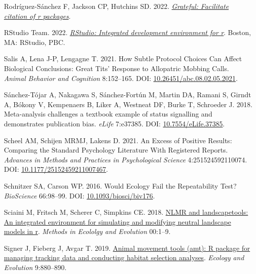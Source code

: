 \documentclass[10pt,a4paper]{article}
\newlength{\cslhangindent}
\newlength{\cslentryspacingunit} %
\newenvironment{CSLReferences}[2] %
 {%
  \setlength{\parindent}{0pt}
  \ifodd #1
  \let\oldpar\par
  \def\par{\hangindent=\cslhangindent\oldpar}
  \fi
  \setlength{\parskip}{#2\cslentryspacingunit}
 }%
 {}
\begin{document}
\begin{CSLReferences}{1}{0}
\leavevmode{}%
Rodríguez-Sánchez F, Jackson CP, Hutchins SD. 2022. \emph{\href{https://github.com/Pakillo/grateful}{Grateful: Facilitate citation of r packages}}.

\leavevmode{}%
RStudio Team. 2022. \emph{\href{http://www.rstudio.com/}{RStudio: Integrated development environment for r}}. Boston, MA: RStudio, PBC.

\leavevmode{}%
Salis A, Lena J-P, Lengagne T. 2021. How {Subtle} {Protocol} {Choices} {Can} {Affect} {Biological} {Conclusions}: {Great} {Tits}' {Response} to {Allopatric} {Mobbing} {Calls}. \emph{Animal Behavior and Cognition} 8:152--165. DOI: \href{https://doi.org/10.26451/abc.08.02.05.2021}{10.26451/abc.08.02.05.2021}.

\leavevmode{}%
Sánchez-Tójar A, Nakagawa S, Sánchez-Fortún M, Martin DA, Ramani S, Girndt A, Bókony V, Kempenaers B, Liker A, Westneat DF, Burke T, Schroeder J. 2018. Meta-analysis challenges a textbook example of status signalling and demonstrates publication bias. \emph{eLife} 7:e37385. DOI: \href{https://doi.org/10.7554/eLife.37385}{10.7554/eLife.37385}.

\leavevmode{}%
Scheel AM, Schijen MRMJ, Lakens D. 2021. An {Excess} of {Positive} {Results}: {Comparing} the {Standard} {Psychology} {Literature} {With} {Registered} {Reports}. \emph{Advances in Methods and Practices in Psychological Science} 4:251524592110074. DOI: \href{https://doi.org/10.1177/25152459211007467}{10.1177/25152459211007467}.

\leavevmode{}%
Schnitzer SA, Carson WP. 2016. Would {Ecology} {Fail} the {Repeatability} {Test}? \emph{BioScience} 66:98--99. DOI: \href{https://doi.org/10.1093/biosci/biv176}{10.1093/biosci/biv176}.

\leavevmode{}%
Sciaini M, Fritsch M, Scherer C, Simpkins CE. 2018. \href{https://doi.org/10.1111/2041-210X.13076}{NLMR and landscapetools: An integrated environment for simulating and modifying neutral landscape models in r}. \emph{Methods in Ecololgy and Evolution} 00:1--9.

\leavevmode{}%
Signer J, Fieberg J, Avgar T. 2019. \href{https://doi.org/10.1002/ece3.4823}{Animal movement tools (amt): R package for managing tracking data and conducting habitat selection analyses}. \emph{Ecology and Evolution} 9:880--890.


\end{CSLReferences}
\end{document}
